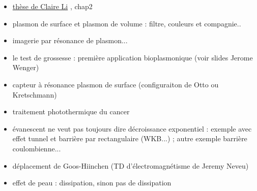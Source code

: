 \begin{remarques} \begin{itemize} 
\item \href{https://hal.archives-ouvertes.fr/tel-02493813/document}{thèse de Claire Li} \cite{ClaireLi}, chap2
\item plasmon de surface et plasmon de volume : filtre, couleurs et compagnie..
\item imagerie par résonance de plasmon...
\item le test de grossesse : première application bioplasmonique (voir slides Jerome Wenger)
\item capteur à résonance plasmon de surface (configuraiton de Otto ou Kretschmann)
\item traitement photothermique du cancer
\item évanescent ne veut pas toujours dire décroissance exponentiel : exemple avec effet tunnel et barrière par rectangulaire (WKB...) ; autre exemple barrière coulombienne...
\item déplacement de Goos-Hiinchen (TD d'électromagnétisme de Jeremy Neveu)
\item effet de peau : dissipation, sinon pas de dissipation
\end{itemize} \end{remarques}